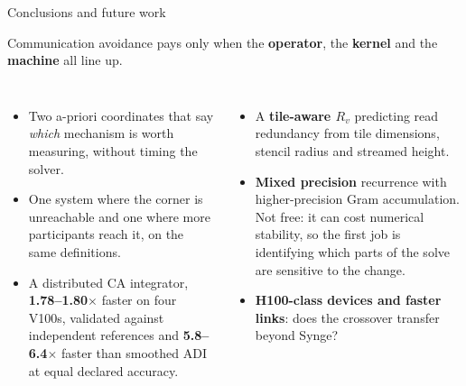 \documentclass{beamerTCD}
\newcommand{\Rv}{R_v}
\begin{document}
\begin{frame}[t]{Conclusions and future work}
\small

  \begin{alertblock}{}
    \begin{center}
      Communication avoidance pays only when the \textbf{operator}, the \textbf{kernel} and the \textbf{machine} all line up.
    \end{center}
  \end{alertblock}

  \begin{columns}[T]
    \begin{itemize}[<2->]\footnotesize
      \item Two a-priori coordinates that say \emph{which} mechanism is worth measuring, without timing the solver.
      \item One system where the corner is unreachable and one where more participants reach it, on the same definitions.
      \item A distributed CA integrator, \textbf{1.78--1.80$\times$} faster on four V100s, validated against independent references and \textbf{5.8--6.4$\times$} faster than smoothed ADI at equal declared accuracy.
    \end{itemize}

    \begin{itemize}[<3->]\footnotesize
      \item A \textbf{tile-aware $\Rv$} predicting read redundancy from tile dimensions, stencil radius and streamed height.
      \item \textbf{Mixed precision} recurrence with higher-precision Gram accumulation. Not free: it can cost numerical stability, so the first job is identifying which parts of the solve are sensitive to the change.
      \item \textbf{H100-class devices and faster links}: does the crossover transfer beyond Synge?
    \end{itemize}
  \end{columns}

\end{frame}
\end{document}
